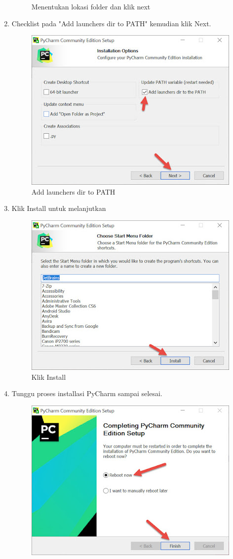 \begin{enumerate}
\begin{figure}[H]
\caption{Menentukan lokasi folder dan klik next}
\label{installpycharm1}
\end{figure}
\item Checklist pada "Add launchers dir to PATH" kemudian klik Next.
\begin{figure}[H]
\centering
\includegraphics[scale=.65]{figures/install_pycharm3}
\caption{Add launchers dir to PATH}
\label{installpycharm3}
\end{figure}
\item Klik Install untuk melanjutkan
\begin{figure}[H]
\centering
\includegraphics[scale=.65]{figures/install_pycharm4}
\caption{Klik Install}
\label{installpycharm4}
\end{figure}
\item Tunggu proses installasi PyCharm sampai selesai.
\begin{figure}[H]
\centering
\includegraphics[scale=.65]{figures/install_pycharm6}

\end{figure}
\end{enumerate}

